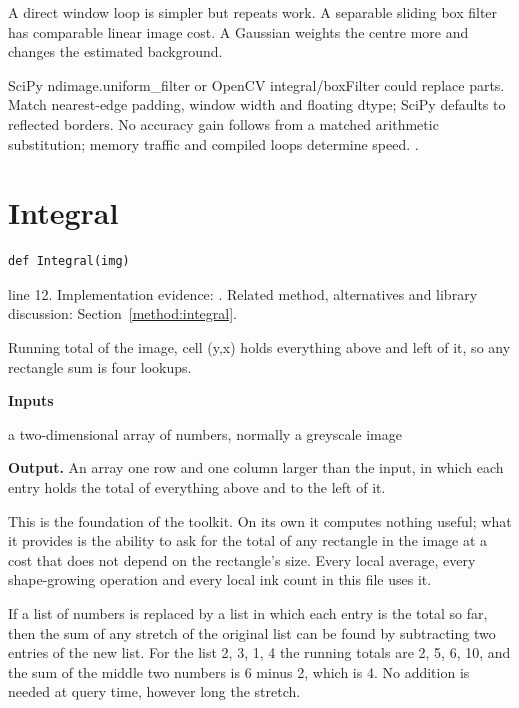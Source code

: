 A direct window loop is simpler but repeats work. A separable sliding box filter has comparable linear image cost. A Gaussian weights the centre more and changes the estimated background.


SciPy ndimage.uniform\_filter or OpenCV integral/boxFilter could replace parts. Match nearest-edge padding, window width and floating dtype; SciPy defaults to reflected borders. No accuracy gain follows from a matched arithmetic substitution; memory traffic and compiled loops determine speed. \cite{crow1984,scipyuniform,opencvthreshold}.


\section{Integral}\label{fn:segment:Integral}
\begin{lstlisting}[style=sig]
def Integral(img)
\end{lstlisting}
 line 12. Implementation evidence: \cite{code2026}. Related method, alternatives and library discussion: Section~\ref{method:integral}.


Running total of the image, cell (y,x) holds everything above and left of it, so any rectangle sum is four lookups.




\noindent\textbf{Inputs}
\begin{description}[leftmargin=2.2em,style=nextline,font=\normalfont\ttfamily]\setlength\itemsep{1pt}
  \item[{img}] \normalfont a two-dimensional array of numbers, normally a greyscale image
\end{description}

\noindent\textbf{Output.} An array one row and one column larger than the input, in which each entry holds the total of everything above and to the left of it.


This is the foundation of the toolkit. On its own it computes nothing useful; what it provides is the ability to ask for the total of any rectangle in the image at a cost that does not depend on the rectangle's size. Every local average, every shape-growing operation and every local ink count in this file uses it.


If a list of numbers is replaced by a list in which each entry is the total so far, then the sum of any stretch of the original list can be found by subtracting two entries of the new list. For the list 2, 3, 1, 4 the running totals are 2, 5, 6, 10, and the sum of the middle two numbers is 6 minus 2, which is 4. No addition is needed at query time, however long the stretch.

